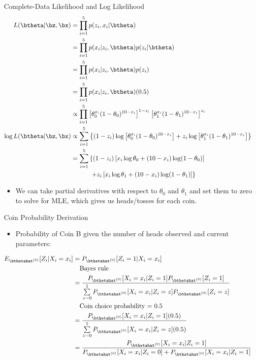 \documentclass[dvipdfmx,bigger,aspectratio=169]{beamer}
\begin{document}
\begin{frame}[allowframebreaks,label=,t]{Complete-Data Likelihood and Log Likelihood}
\begin{align*}
\label{eq:orgf992aaf}
  L(\btheta | \bz,\bx)
  &= \prod^{5}_{i=1} p(z_{i},x_{i} | \btheta)\\
  &= \prod^{5}_{i=1} p(x_{i} | z_{i}, \btheta) p(z_{i} | \btheta)\\
  &= \prod^{5}_{i=1} p(x_{i} | z_{i}, \btheta) p(z_{i})\\
  &= \prod^{5}_{i=1} p(x_{i} | z_{i}, \btheta) (0.5)\\
  &\propto \prod^{5}_{i=1}
    \left[ \theta_{0}^{x_{i}}(1-\theta_{0})^{10-x_{i}} \right]^{1-z_{i}}
    \left[ \theta_{1}^{x_{i}}(1-\theta_{1})^{10-x_{i}} \right]^{z_{i}}\\
  \log L(\btheta | \bz,\bx)
  &\propto \sum^{5}_{i=1}
    \left\{
    (1-z_{i}) \log \left[ \theta_{0}^{x_{i}}(1-\theta_{0})^{10-x_{i}} \right] +
    z_{i} \log \left[ \theta_{1}^{x_{i}}(1-\theta_{1})^{10-x_{i}} \right]
    \right\}\\
  &= \sum^{5}_{i=1}
    \left\{
    (1-z_{i}) \left[ x_{i}\log\theta_{0} + (10-x_{i})\log(1-\theta_{0})\right]
    \right.\\
  &~~~~~~~~~ \left.
    + z_{i} \left[ x_{i}\log\theta_{1} + (10-x_{i})\log(1-\theta_{1})\right]
    \right\}
\end{align*}
\begin{itemize}
\item We can take partial derivatives with respect to \(\theta_{0}\) and \(\theta_{1}\) and set them to zero to solve for MLE, which gives us heads/tosses for each coin.
\end{itemize}
\end{frame}

\begin{frame}[label={sec:org29e1198}]{Coin Probability Derivation}
\begin{itemize}
\item Probability of Coin B given the number of heads observed and current parameters:
\end{itemize}
\footnotesize
\begin{align*}
  E_{\bthetahat^{(0)}}[Z_{i} | X_{i} = x_{i}] &= P_{\bthetahat^{(0)}}[Z_{i} = 1 | X_{i} = x_{i}]\\
  &~~~\text{Bayes rule}\\
  &= \frac{P_{\bthetahat^{(0)}}[X_{i} = x_{i} | Z_{i} = 1] P_{\bthetahat^{(0)}}[Z_{i} = 1]}
          {\sum\limits^{1}_{z=0} P_{\bthetahat^{(0)}}[X_{i} = x_{i} | Z_{i} = z] P_{\bthetahat^{(0)}}[Z_{i} = z]}\\
  &~~~\text{Coin choice probability = 0.5}\\
  &= \frac{P_{\bthetahat^{(0)}}[X_{i} = x_{i} | Z_{i} = 1] (0.5)}
          {\sum\limits^{1}_{z=0} P_{\bthetahat^{(0)}}[X_{i} = x_{i} | Z_{i} = z] (0.5)}\\
  &= \frac{P_{\bthetahat^{(0)}}[X_{i} = x_{i} | Z_{i} = 1]}
          {P_{\bthetahat^{(0)}}[X_{i} = x_{i} | Z_{i} = 0] + P_{\bthetahat^{(0)}}[X_{i} = x_{i} | Z_{i} = 1]}
\end{align*}
\normalsize
\end{frame}
\end{document}
